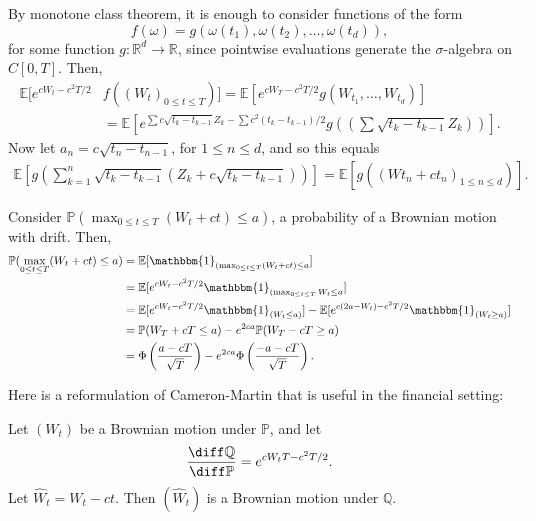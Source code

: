 \documentclass[12pt]{article}
\begin{document}
\begin{proofbox}
	By monotone class theorem, it is enough to consider functions of the form
	\[
	f(\omega) = g(\omega(t_1), \omega(t_2), \ldots, \omega(t_d)),
	\]
	for some function $g : \mathbb{R}^d \to \mathbb{R}$, since pointwise evaluations generate the $\sigma$-algebra on $C[0, T]$. Then,
	\begin{align*}
		\mathbb{E}[e^{cW_t - c^2T/2}&f((W_t)_{0 \leq t \leq T})] = \mathbb{E}[e^{cW_T - c^2T/2}g(W_{t_1}, \ldots, W_{t_d})] \\
									&= \mathbb{E}\left[e^{\sum c\sqrt{t_k - t_{k-1}} Z_k - \sum c^2(t_k - t_{k-1})/2} g\left( \left( \sum \sqrt{t_k - t_{k-1}} Z_k \right)  \right) \right].
	\end{align*}
	Now let $a_n = c \sqrt{t_n - t_{n-1}}$, for $1 \leq n \leq d$, and so this equals
	\begin{align*}
		\mathbb{E}\left[ g \left( \sum_{k = 1}^n \sqrt{t_k - t_{k-1}} (Z_k + c \sqrt{t_k - t_{k-1}}) \right) \right] = \mathbb{E}[g((Wt_n + ct_n)_{1 \leq n \leq d})].
	\end{align*}
	
\end{proofbox}

\begin{exbox}
	Consider $\mathbb{P}(\max_{0 \leq t \leq T} (W_t + ct) \leq a)$, a probability of a Brownian motion with drift. Then,
	\begin{align*}
		\mathbb{P}( \max_{0 \leq t \leq T} (W_t + ct) \leq a) &= \mathbb{E}[\mathbbm{1}_{(\max_{0 \leq t \leq T}(W_t + ct) \leq a}] \\
								      &= \mathbb{E}[e^{c W_t - c^2T/2} \mathbbm{1}_{(\max _{ 0 \leq t \leq T} W_t \leq a}] \\
								      &= \mathbb{E}[e^{cW_t - c^2T/2} \mathbbm{1}_{(W_t \leq a)}] - \mathbb{E}[e^{c(2a - W_t) - c^2T/2} \mathbbm{1}_{(W_t \geq a)}] \\
								      &= \mathbb{P}(W_T + cT \leq a) - e^{2ca}\mathbb{P}(W_T - cT \geq a) \\
								      &= \Phi \left( \frac{a - cT}{\sqrt T} \right) - e^{2ca} \Phi \left( \frac{-a - cT}{\sqrt T} \right).
	\end{align*}
\end{exbox}

Here is a reformulation of Cameron-Martin that is useful in the financial setting:

Let $(W_t)$ be a Brownian motion under $\mathbb{P}$, and let
\[
\frac{\diff \mathbb{Q}}{\diff \mathbb{P}} = e^{c W_tT- c^2T/2}.
\]
Let $\hat W_t = W_t - ct$. Then $(\hat W_t)$ is a Brownian motion under $\mathbb{Q}$.
\end{document}
